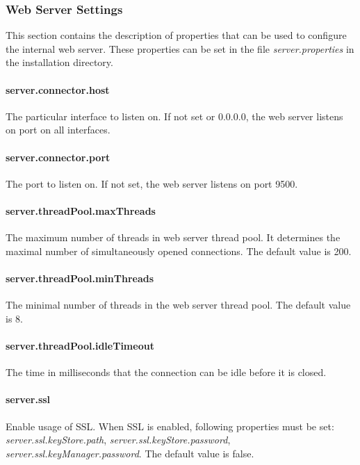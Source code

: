 \subsubsection{Web Server Settings}
\label{sssec:WebServerSettings}
This section contains the description of properties that can be used to
configure the internal web server. These properties can be set in the file
\emph{server.properties} in the installation directory.

\paragraph{server.connector.host}
The particular interface to listen on. If not set or 0.0.0.0, the web server
listens on port on all interfaces.

\paragraph{server.connector.port}
The port to listen on. If not set, the web server listens on port 9500.

\paragraph{server.threadPool.maxThreads}
The maximum number of threads in web server thread pool. It determines the
maximal number of simultaneously opened connections. The default value is 200.

\paragraph{server.threadPool.minThreads}
The minimal number of threads in the web server thread pool. The default value
is 8.

\paragraph{server.threadPool.idleTimeout}
The time in milliseconds that the connection can be idle before it is closed.

\paragraph{server.ssl}
Enable usage of SSL. When SSL is enabled, following properties must be set:
\emph{server.\-ssl.\-keyStore.\-path}, \emph{server.\-ssl.\-keyStore.\-password},
\emph{server.\-ssl.\-keyManager.\-password}. The default value is false.

